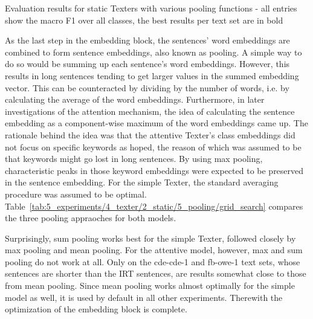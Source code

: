 \begin{table}[h]
    \centering
    
    \caption{Evaluation results for static Texters with various pooling functions - all entries show the macro F1 over all classes, the best results per text set are in bold}
    \label{tab:5_experiments/4_texter/2_static/5_pooling/grid_search}
\end{table}

As the last step in the embedding block, the sentences' word embeddings are combined to form sentence embeddings, also known as pooling. A simple way to do so would be summing up each sentence's word embeddings. However, this results in long sentences tending to get larger values in the summed embedding vector. This can be counteracted by dividing by the number of words, i.e. by calculating the average of the word embeddings. Furthermore, in later investigations of the attention mechanism, the idea of calculating the sentence embedding as a component-wise maximum of the word embeddings came up. The rationale behind the idea was that the attentive Texter's class embeddings did not focus on specific keywords as hoped, the reason of which was assumed to be that keywords might go lost in long sentences. By using max pooling, characteristic peaks in those keyword embeddings were expected to be preserved in the sentence embedding. For the simple Texter, the standard averaging procedure was assumed to be optimal. Table~\ref{tab:5_experiments/4_texter/2_static/5_pooling/grid_search} compares the three pooling appraoches for both models.

Surprisingly, sum pooling works best for the simple Texter, followed closely by max pooling and mean pooling. For the attentive model, however, max and sum pooling do not work at all. Only on the cde-cde-1 and fb-owe-1 text sets, whose sentences are shorter than the IRT sentences, are results somewhat close to those from mean pooling. Since mean pooling works almost optimally for the simple model as well, it is used by default in all other experiments. Therewith the optimization of the embedding block is complete.
